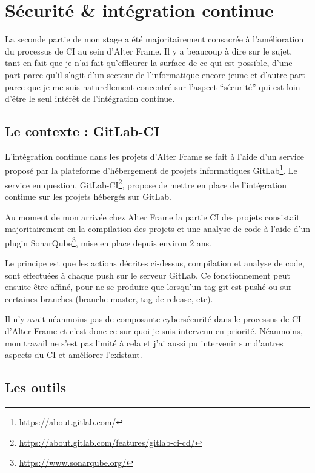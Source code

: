 \section{Sécurité \& intégration continue}
La seconde partie de mon stage a été majoritairement consacrée à l'amélioration du processus de CI au sein d'Alter Frame. Il y a beaucoup à dire sur le sujet, tant en fait que je n'ai fait qu'effleurer la surface de ce qui est possible, d'une part parce qu'il s'agit d'un secteur de l'informatique encore jeune et d'autre part parce que je me suis naturellement concentré sur l'aspect ``sécurité'' qui est loin d'être le seul intérêt de l'intégration continue.

\subsection{Le contexte : GitLab-CI}
L'intégration continue dans les projets d'Alter Frame se fait à l'aide d'un service proposé par la plateforme d'hébergement de projets informatiques GitLab\footnote{\url{https://about.gitlab.com/}}. Le service en question, GitLab-CI\footnote{\url{https://about.gitlab.com/features/gitlab-ci-cd/}}, propose de mettre en place de l'intégration continue sur les projets hébergés sur GitLab.

Au moment de mon arrivée chez Alter Frame la partie CI des projets consistait majoritairement en la compilation des projets et une analyse de code à l'aide d'un plugin SonarQube\footnote{\url{https://www.sonarqube.org/}}, mise en place depuis environ 2 ans.

Le principe est que les actions décrites ci-dessus, compilation et analyse de code, sont effectuées à chaque push sur le serveur GitLab. Ce fonctionnement peut ensuite être affiné, pour ne se produire que lorsqu'un tag git est pushé ou sur certaines branches (branche master, tag de release, etc).

Il n'y avait néanmoins pas de composante cybersécurité dans le processus de CI d'Alter Frame et c'est donc ce sur quoi je suis intervenu en priorité. Néanmoins, mon travail ne s'est pas limité à cela et j'ai aussi pu intervenir sur d'autres aspects du CI et améliorer l'existant.

\subsection{Les outils}
